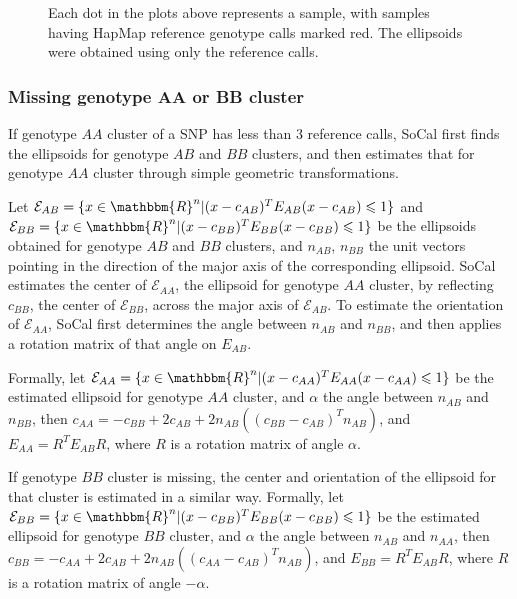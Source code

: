 \documentclass{scrartcl}
\begin{document}
\begin{figure}[H]
{        \label{fig:sparse_cluster}
    }
    \caption{Each dot in the plots above represents a sample, with
             samples having HapMap reference genotype calls marked red.
             The ellipsoids were obtained using only the reference calls.}
    \label{fig:defined_sparse_cluster}
\end{figure}

\subsubsection{Missing genotype AA or BB cluster}

\par
If genotype $AA$ cluster of a SNP has less than 3 reference calls, SoCal
first finds the ellipsoids for genotype $AB$ and $BB$ clusters, and then
estimates that for genotype $AA$ cluster through simple geometric
transformations.

\par
Let $\mathcal{E}_{AB}=
\{x \in \mathbbm{R}^{n}|(x-c_{AB})^TE_{AB}(x-c_{AB}) \leqslant 1\}$
and $\mathcal{E}_{BB}=
\{x \in \mathbbm{R}^{n}|(x-c_{BB})^TE_{BB}(x-c_{BB}) \leqslant 1\}$
be the ellipsoids obtained for genotype $AB$ and $BB$ clusters,
and $n_{AB}$, $n_{BB}$ the unit vectors pointing in the direction of
the major axis of the corresponding ellipsoid.
SoCal estimates the center of $\mathcal{E}_{AA}$, the ellipsoid for genotype
$AA$ cluster, by reflecting $c_{BB}$, the center of $\mathcal{E}_{BB}$, across
the major axis of $\mathcal{E}_{AB}$.
To estimate the orientation of $\mathcal{E}_{AA}$, SoCal first determines the
angle between $n_{AB}$ and $n_{BB}$, and then applies a rotation matrix of
that angle on $E_{AB}$.

\par
Formally, let $\mathcal{E}_{AA}=
\{x \in \mathbbm{R}^{n}|(x-c_{AA})^TE_{AA}(x-c_{AA}) \leqslant 1\}$ be the
estimated ellipsoid for genotype $AA$ cluster, and $\alpha$ the angle between
$n_{AB}$ and $n_{BB}$, then
$c_{AA}=-c_{BB}+2c_{AB}+2n_{AB}((c_{BB}-c_{AB})^{T}n_{AB})$, and
$E_{AA}=R^{T}E_{AB}R$, where $R$ is a rotation matrix of angle $\alpha$.

\par
If genotype $BB$ cluster is missing, the center and orientation of the
ellipsoid for that cluster is estimated in a similar way.
Formally, let $\mathcal{E}_{BB}=
\{x \in \mathbbm{R}^{n}|(x-c_{BB})^TE_{BB}(x-c_{BB}) \leqslant 1\}$ be the
estimated ellipsoid for genotype $BB$ cluster, and $\alpha$ the angle between
$n_{AB}$ and $n_{AA}$, then
$c_{BB}=-c_{AA}+2c_{AB}+2n_{AB}((c_{AA}-c_{AB})^{T}n_{AB})$, and
$E_{BB}=R^{T}E_{AB}R$, where $R$ is a rotation matrix of angle $-\alpha$.
\end{document}
